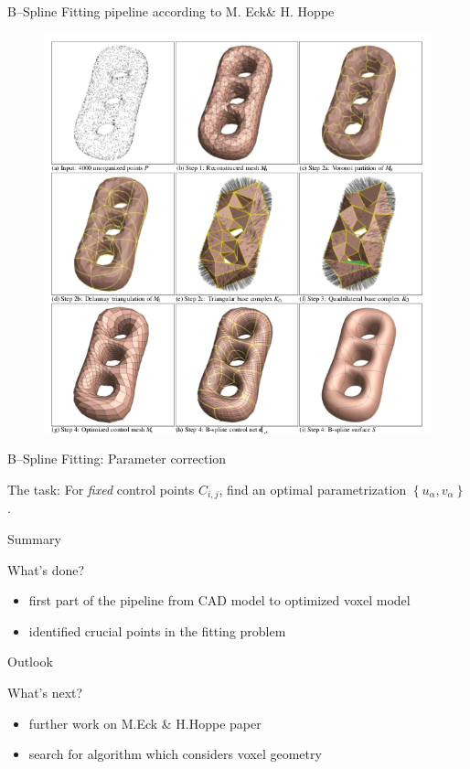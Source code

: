 \begin{frame}{B--Spline Fitting pipeline according to M. Eck\& H. Hoppe}
\begin{figure}
\includegraphics[width=0.7\linewidth]{Pictures/HoppePipeline.png}
\end{figure}
\end{frame}

\begin{frame}{B--Spline Fitting: Parameter correction}
\begin{block}{The task:}
For \textit{fixed} control points $C_{i,j}$, find an optimal parametrization $\left\lbrace u_\alpha,v_\alpha \right\rbrace$.
\end{block}

\end{frame}

\begin{frame}{Summary}
\begin{block}{What's done?}
\begin{itemize}
\item first part of the pipeline from CAD model to optimized voxel model
\item identified crucial points in the fitting problem
\end{itemize}
\end{block}
\end{frame}

\begin{frame}{Outlook}
\begin{block}{What's next?}
\begin{itemize}
\item further work on M.Eck \& H.Hoppe paper
\item search for algorithm which considers voxel geometry
\end{itemize}
\end{block}
\end{frame}